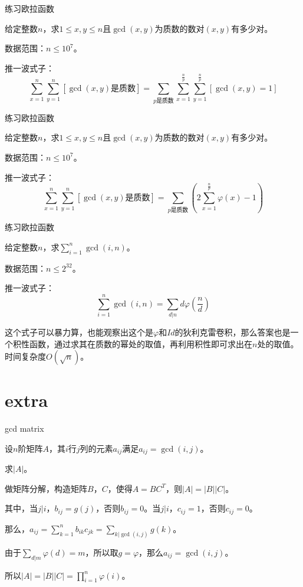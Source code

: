 \documentclass{ctexbeamer}        %
\begin{document}
\begin{frame}{练习}{欧拉函数}

\begin{example}[accoders2564]
	给定整数$n$，求$1\le x,y \le n$且$\gcd(x,y)$为质数的数对$(x,y)$有多少对。

	数据范围：$n\le 10^7$。
\end{example}
\pause
推一波式子：
$$\sum_{x=1}^n \sum_{y=1}^n [\gcd(x,y)\text{是质数}]=\sum_{p\text{是质数}} \sum_{x=1}^{\frac{n}{p}} \sum_{y=1}^{\frac{n}{p}} [\gcd(x,y)=1]$$
\end{frame}

\begin{frame}{练习}{欧拉函数}

\begin{example}[accoders2564]
	给定整数$n$，求$1\le x,y \le n$且$\gcd(x,y)$为质数的数对$(x,y)$有多少对。

	数据范围：$n\le 10^7$。
\end{example}
推一波式子：
$$\sum_{x=1}^n \sum_{y=1}^n [\gcd(x,y)\text{是质数}]=\sum_{p\text{是质数}}(2\sum_{x=1}^{\frac{n}{p}} \varphi(x) - 1)$$
\end{frame}

\begin{frame}{练习}{欧拉函数}

\begin{example}[accoders6110]
	给定整数$n$，求$\sum_{i=1}^n \gcd(i,n)$。

	数据范围：$n\le 2^{32}$。
\end{example}
\pause
推一波式子：
$$\sum_{i=1}^n \gcd(i,n)=\sum_{d|n} d\varphi(\frac{n}{d})$$

这个式子可以暴力算，也能观察出这个是$\varphi$和$Id$的狄利克雷卷积，那么答案也是一个积性函数，通过求其在质数的幂处的取值，再利用积性即可求出在$n$处的取值。时间复杂度$O(\sqrt{n})$。
\end{frame}

\section{extra}

\begin{frame}{gcd matrix}

\begin{example}
	设$n$阶矩阵$A$，其$i$行$j$列的元素$a_{ij}$满足$a_{ij}=\gcd(i,j)$。

	求$|A|$。
\end{example}
\pause
做矩阵分解，构造矩阵$B$，$C$，使得$A=BC^T$，则$|A|=|B||C|$。

其中，当$j|i$，$b_{ij}=g(j)$，否则$b_{ij}=0$。当$j|i$，$c_{ij}=1$，否则$c_{ij}=0$。

那么，$a_{ij}=\sum_{k=1}^n b_{ik}c_{jk}=\sum_{k|\gcd(i,j)}g(k)$。

由于$\sum_{d|m} \varphi(d) = m$，所以取$g=\varphi$，那么$a_{ij}=\gcd(i,j)$。

所以$|A|=|B||C|=\prod_{i=1}^n \varphi(i)$。
\end{frame}
\end{document}
